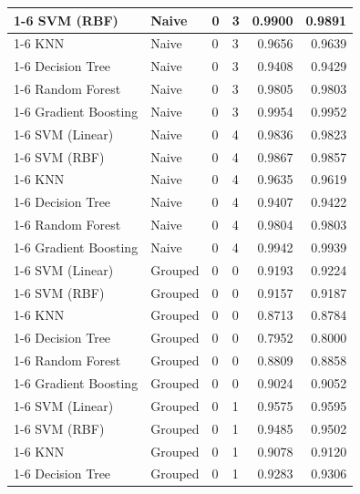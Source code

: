 \begin{table}
\begin{tabular}{llllrr}
\cline{1-6} \cline{2-6} \cline{3-6}
SVM (RBF) & Naive & 0 & 3 & 0.9900 & 0.9891 \\
\cline{1-6} \cline{2-6} \cline{3-6}
KNN & Naive & 0 & 3 & 0.9656 & 0.9639 \\
\cline{1-6} \cline{2-6} \cline{3-6}
Decision Tree & Naive & 0 & 3 & 0.9408 & 0.9429 \\
\cline{1-6} \cline{2-6} \cline{3-6}
Random Forest & Naive & 0 & 3 & 0.9805 & 0.9803 \\
\cline{1-6} \cline{2-6} \cline{3-6}
Gradient Boosting & Naive & 0 & 3 & 0.9954 & 0.9952 \\
\cline{1-6} \cline{2-6} \cline{3-6}
SVM (Linear) & Naive & 0 & 4 & 0.9836 & 0.9823 \\
\cline{1-6} \cline{2-6} \cline{3-6}
SVM (RBF) & Naive & 0 & 4 & 0.9867 & 0.9857 \\
\cline{1-6} \cline{2-6} \cline{3-6}
KNN & Naive & 0 & 4 & 0.9635 & 0.9619 \\
\cline{1-6} \cline{2-6} \cline{3-6}
Decision Tree & Naive & 0 & 4 & 0.9407 & 0.9422 \\
\cline{1-6} \cline{2-6} \cline{3-6}
Random Forest & Naive & 0 & 4 & 0.9804 & 0.9803 \\
\cline{1-6} \cline{2-6} \cline{3-6}
Gradient Boosting & Naive & 0 & 4 & 0.9942 & 0.9939 \\
\cline{1-6} \cline{2-6} \cline{3-6}
SVM (Linear) & Grouped & 0 & 0 & 0.9193 & 0.9224 \\
\cline{1-6} \cline{2-6} \cline{3-6}
SVM (RBF) & Grouped & 0 & 0 & 0.9157 & 0.9187 \\
\cline{1-6} \cline{2-6} \cline{3-6}
KNN & Grouped & 0 & 0 & 0.8713 & 0.8784 \\
\cline{1-6} \cline{2-6} \cline{3-6}
Decision Tree & Grouped & 0 & 0 & 0.7952 & 0.8000 \\
\cline{1-6} \cline{2-6} \cline{3-6}
Random Forest & Grouped & 0 & 0 & 0.8809 & 0.8858 \\
\cline{1-6} \cline{2-6} \cline{3-6}
Gradient Boosting & Grouped & 0 & 0 & 0.9024 & 0.9052 \\
\cline{1-6} \cline{2-6} \cline{3-6}
SVM (Linear) & Grouped & 0 & 1 & 0.9575 & 0.9595 \\
\cline{1-6} \cline{2-6} \cline{3-6}
SVM (RBF) & Grouped & 0 & 1 & 0.9485 & 0.9502 \\
\cline{1-6} \cline{2-6} \cline{3-6}
KNN & Grouped & 0 & 1 & 0.9078 & 0.9120 \\
\cline{1-6} \cline{2-6} \cline{3-6}
Decision Tree & Grouped & 0 & 1 & 0.9283 & 0.9306 \\

\end{tabular}
\end{table}
